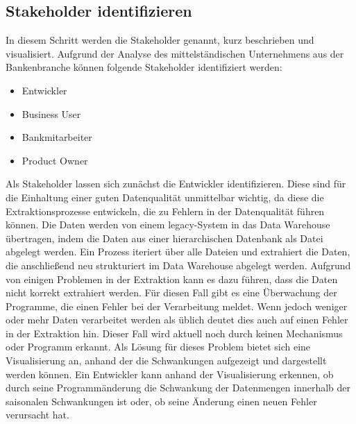 
\subsection{Stakeholder identifizieren}
In diesem Schritt werden die Stakeholder genannt, kurz beschrieben und visualisiert. 
Aufgrund der Analyse des mittelständischen Unternehmens aus der Bankenbranche können folgende Stakeholder identifiziert werden:
\begin{itemize}
\item Entwickler            %
\item Business User         %
\item Bankmitarbeiter       %
\item Product Owner         %
\end{itemize}





Als Stakeholder lassen sich zunächst die Entwickler identifizieren.
Diese sind für die Einhaltung einer guten Datenqualität unmittelbar wichtig, da diese die Extraktionsprozesse entwickeln, die zu Fehlern in der Datenqualität führen können.
Die Daten werden von einem legacy-System in das Data Warehouse übertragen, indem die Daten aus einer hierarchischen Datenbank als Datei abgelegt werden.
Ein Prozess iteriert über alle Dateien und extrahiert die Daten, die anschließend neu strukturiert im Data Warehouse abgelegt werden.
Aufgrund von einigen Problemen in der Extraktion kann es dazu führen, dass die Daten nicht korrekt extrahiert werden.
Für diesen Fall gibt es eine Überwachung der Programme, die einen Fehler bei der Verarbeitung meldet.
Wenn jedoch weniger oder mehr Daten verarbeitet werden als üblich deutet dies auch auf einen Fehler in der Extraktion hin. 
Dieser Fall wird aktuell noch durch keinen Mechanismus oder Programm erkannt. 
Als Lösung für dieses Problem bietet sich eine Visualisierung an, anhand der die Schwankungen aufgezeigt und dargestellt werden können. 
Ein Entwickler kann anhand der Visualisierung erkennen, ob durch seine Programmänderung die Schwankung der Datenmengen innerhalb der saisonalen Schwankungen ist oder, ob seine Änderung einen neuen Fehler verursacht hat. 

